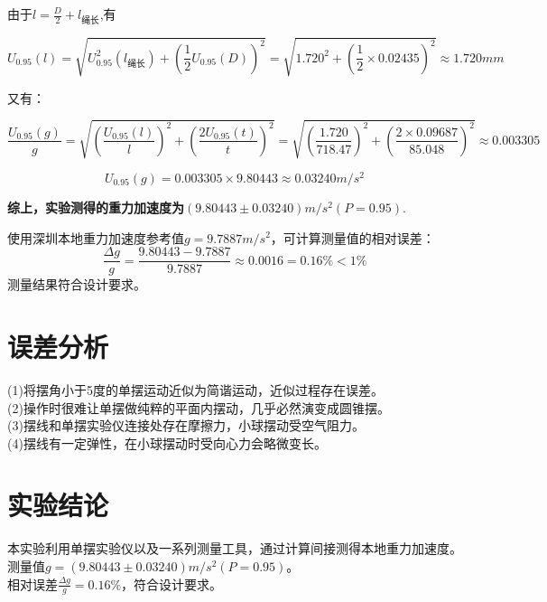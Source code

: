 \documentclass[12pt,a4paper]{article}
\begin{document}
	由于\( l = \frac{D}{2} + l_{\text{绳长}} \),有
	
	\[ U_{0.95}(l) =  \sqrt{U_{0.95}^2(l_{\text{绳长}}) + (\frac{1}{2}U_{0.95}(D))^2} = \sqrt{1.720^2 + (\frac{1}{2}\times 0.02435)^2} \approx 1.720mm \]
	
	又有：
	
	\[ \frac{U_{0.95}(g)}{g} = 	\sqrt{(\frac{U_{0.95}(l)}{l})^2 + (\frac{2U_{0.95}(t)}{t})^2} = \sqrt{(\frac{1.720}{718.47})^2 + (\frac{2\times 0.09687}{85.048})^2} \approx 0.003305 \]
	
	\[ U_{0.95}(g) = 0.003305 \times 9.80443 \approx 0.03240m/s^2 \]
	
	\textbf{综上，实验测得的重力加速度为$(9.80443 \pm 0.03240)m/s^2(P=0.95)$}.
	
	使用深圳本地重力加速度参考值$g = 9.7887m/s^2$，可计算测量值的相对误差：
	\[ \frac{\Delta g}{g} = \frac{9.80443-9.7887}{9.7887} \approx 0.0016 = 0.16\% < 1\% \]
	测量结果符合设计要求。
	
	\section{误差分析}
	(1)将摆角小于5度的单摆运动近似为简谐运动，近似过程存在误差。
	\\
	(2)操作时很难让单摆做纯粹的平面内摆动，几乎必然演变成圆锥摆。
	\\
	(3)摆线和单摆实验仪连接处存在摩擦力，小球摆动受空气阻力。
	\\
	(4)摆线有一定弹性，在小球摆动时受向心力会略微变长。
	
	\section{实验结论}
	本实验利用单摆实验仪以及一系列测量工具，通过计算间接测得本地重力加速度。
	\\
	测量值$g=(9.80443 \pm 0.03240)m/s^2(P=0.95)$。
	\\
	相对误差$\frac{\Delta g}{g} = 0.16\%$，符合设计要求。

	
	
\end{document}
